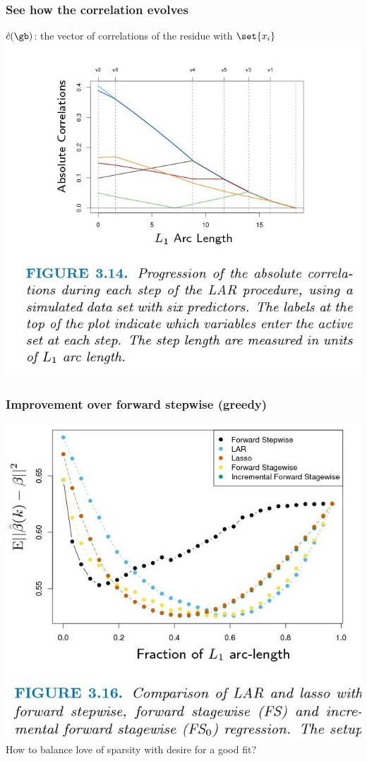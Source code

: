 \documentclass{beamer}
\begin{document}
\begin{frame}
\frametitle{See how the correlation evolves}
\begin{itemize}
\pitem $\hat{c}(\gb)$: the vector of correlations of the residue with $\set{x_{i}}$\\
\includegraphics[scale=0.25]{images/figures3-13.jpg}
\end{itemize}
\end{frame}

\begin{frame}
\frametitle{Improvement over forward stepwise (greedy)}
\includegraphics[scale=.25]{images/figures3-15.jpg}
\\How to balance love of sparsity with desire for a good fit?
\end{frame}
\end{document}
